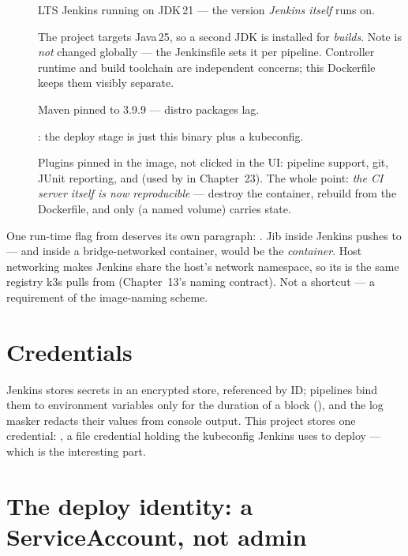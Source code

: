 \begin{description}
  \item[] LTS Jenkins running on JDK\,21 --- the version
  \emph{Jenkins itself} runs on.
  \item[] The project targets Java\,25, so a second JDK is
  installed for \emph{builds}. Note  is \emph{not}
  changed globally  --- the Jenkinsfile sets it per pipeline.
  Controller runtime and build toolchain are independent concerns; this
  Dockerfile keeps them visibly separate.
  \item[] Maven pinned to 3.9.9 --- distro packages lag.
  \item[] : the deploy stage is just this binary
  plus a kubeconfig.
  \item[] Plugins pinned in the image, not clicked in the UI:
  pipeline support, git, JUnit reporting, and
   (used by  in
  Chapter~23). The whole point: \emph{the CI server itself is now
  reproducible} --- destroy the container, rebuild from the Dockerfile,
  and only  (a named volume) carries state.
\end{description}

One run-time flag from  deserves its own paragraph:
. Jib inside Jenkins pushes to
 --- and inside a bridge-networked container,
 would be the \emph{container}. Host networking makes
Jenkins share the host's network namespace, so its
 is the same registry k3s pulls from
(Chapter~13's naming contract). Not a shortcut --- a requirement of the
image-naming scheme.

\section{Credentials}

Jenkins stores secrets in an encrypted store, referenced by ID;
pipelines bind them to environment variables only for the duration of a
block (), and the log masker redacts their
values from console output. This project stores one credential:
, a file credential holding the kubeconfig Jenkins
uses to deploy --- which is the interesting part.

\section{The deploy identity: a ServiceAccount, not admin}

